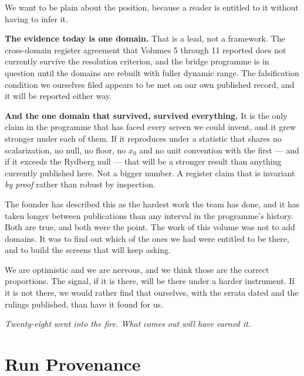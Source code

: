 \documentclass[11pt, letterpaper, openany]{book}
\begin{document}
\begin{signalbox}
We want to be plain about the position, because a reader is entitled to it without having to
infer it.

\medskip
\noindent \textbf{The evidence today is one domain.} That is a lead, not a framework. The
cross-domain register agreement that Volumes 5 through 11 reported does not currently survive
the resolution criterion, and the bridge programme is in question until the domains are rebuilt
with fuller dynamic range. The falsification condition we ourselves filed appears to be met on
our own published record, and it will be reported either way.

\medskip
\noindent \textbf{And the one domain that survived, survived everything.} It is the only claim
in the programme that has faced every screen we could invent, and it grew stronger under each of
them. If it reproduces under a statistic that shares no scalarization, no null, no floor, no
$x_0$ and no unit convention with the first --- and if it exceeds the Rydberg null --- that will
be a stronger result than anything currently published here. Not a bigger number. A register
claim that is invariant \emph{by proof} rather than robust by inspection.
\end{signalbox}

The founder has described this as the hardest work the team has done, and it has taken longer
between publications than any interval in the programme's history. Both are true, and both were
the point. The work of this volume was not to add domains. It was to find out which of the ones
we had were entitled to be there, and to build the screens that will keep asking.

We are optimistic and we are nervous, and we think those are the correct proportions. The
signal, if it is there, will be there under a harder instrument. If it is not there, we would
rather find that ourselves, with the errata dated and the rulings published, than have it found
for us.

\begin{center}
\vspace{0.5em}
\itshape
Twenty-eight went into the fire. What comes out will have earned it.
\vspace{0.5em}
\end{center}


\appendix

\chapter{Run Provenance}
\end{document}
